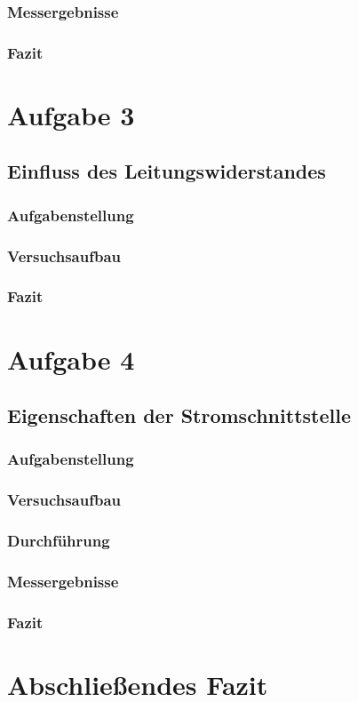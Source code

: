 \documentclass[a4paper,11pt,oneside]{article}
\begin{document}
\subsubsection{Messergebnisse}
\subsubsection{Fazit}


\section{Aufgabe 3}
\subsection{Einfluss des Leitungswiderstandes}
\subsubsection{Aufgabenstellung}
\subsubsection{Versuchsaufbau}
\subsubsection{Fazit}


\section{Aufgabe 4}
\subsection{Eigenschaften der Stromschnittstelle}
\subsubsection{Aufgabenstellung}
\subsubsection{Versuchsaufbau}
\subsubsection{Durchführung}
\subsubsection{Messergebnisse}
\subsubsection{Fazit}

\section{Abschließendes Fazit}
\end{document}
